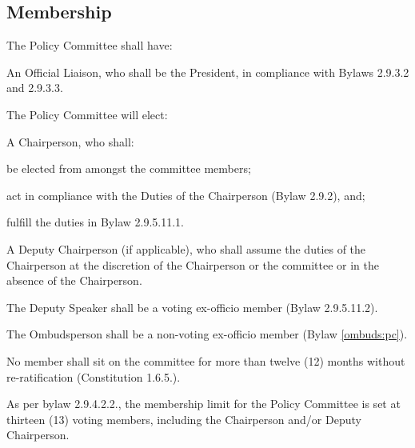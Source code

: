 \subsection{Membership}
\begin{longenum}[ label*=\thesubsection.\arabic*., align=left] 
\item The Policy Committee shall have:
	\begin{longenum}[label*=\arabic*., align=left]	
	\item An Official Liaison, who shall be the President, in compliance with Bylaws 2.9.3.2 and
2.9.3.3.
	\item The Policy Committee will elect:
		\begin{longenum}[label*=\arabic*., align=left]	
		\item A Chairperson, who shall:
			\begin{longenum}[label*=\arabic*., align=left]	
			\item be elected from amongst the committee members;
			\item act in compliance with the Duties of the Chairperson (Bylaw 2.9.2), and;
			\item fulfill the duties in Bylaw 2.9.5.11.1.
			\end{longenum}
		\item A Deputy Chairperson (if applicable), who shall assume the duties of the Chairperson at the discretion of the Chairperson or the committee or in the absence of the Chairperson.
		\end{longenum}
	\item The Deputy Speaker shall be a voting ex-officio member (Bylaw 2.9.5.11.2).
	\item The Ombudsperson shall be a non-voting ex-officio member (Bylaw \ref{ombuds:pc}).
	\end{longenum}
\item No member shall sit on the committee for more than twelve (12) months without re-ratification (Constitution 1.6.5.).
\item As per bylaw 2.9.4.2.2., the membership limit for the Policy Committee is set at thirteen (13) voting members, including the Chairperson and/or Deputy Chairperson.
\end{longenum}

